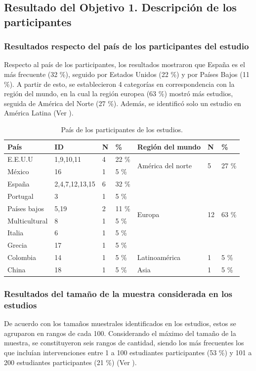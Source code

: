 \documentclass[spanish]{textolivre}
\begin{document}
\subsection{Resultado del Objetivo 1. Descripción de los participantes}

\subsubsection{Resultados respecto del país de los participantes del estudio}

Respecto al país de los participantes, los resultados mostraron que España es el más frecuente (32 \%), seguido por Estados Unidos (22 \%) y por Países Bajos (11 \%). A partir de esto, se establecieron 4 categorías en correspondencia con la región del mundo, en la cual la región europea (63 \%) mostró más estudios, seguida de América del Norte (27 \%). Además, se identificó solo un estudio en América Latina (Ver ). 

\begin{table}[htbp]
\caption{País de los participantes de los estudios.}
\label{tbl2}
\centering
\begin{tabular}{l l l l l l l}
\toprule 
\textbf{País} & \textbf{ID} & \textbf{N} & \textbf{\%} & \textbf{Región del mundo} & \textbf{N} & \textbf{\%}
\\
\midrule
E.E.U.U & 1,9,10,11 & 4 & 22 \% & \multirow{2}{*}{América del norte} & \multirow{2}{*}{5} & \multirow{2}{*}{27 \%}
\\
México & 16 & 1 & 5 \% & & &
\\
España & 2,4,7,12,13,15 & 6 & 32 \% & \multirow{6}{*}{Europa} & \multirow{6}{*}{12} & \multirow{6}{*}{63 \%}
\\
Portugal & 3 & 1 & 5 \% & & &
\\
Países bajos & 5,19 & 2 & 11 \% & & &
\\
Multicultural & 8 & 1 & 5 \% & & &
\\
Italia & 6 & 1 & 5 \% & & &
\\
Grecia & 17 & 1 & 5 \% & & &
\\
Colombia & 14 & 1 & 5 \% & Latinoamérica & 1 & 5 \%
\\
China & 18 & 1 & 5 \% & Asia & 1 & 5 \%
\\
\bottomrule
\end{tabular}
\end{table}

\subsubsection{Resultados del tamaño de la muestra considerada en los estudios}\label{sec-modelo}
De acuerdo con los tamaños muestrales identificados en los estudios, estos se agruparon en rangos de cada 100. Considerando el máximo del tamaño de la muestra, se constituyeron seis rangos de cantidad, siendo los más frecuentes los que incluían intervenciones entre 1 a 100 estudiantes participantes (53 \%) y 101 a 200 estudiantes participantes (21 \%) (Ver ).
 
\end{document}
